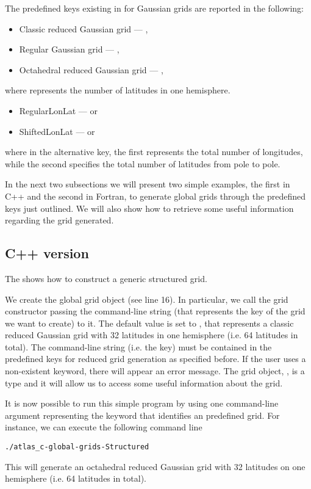 The predefined keys existing in \Atlas for Gaussian grids 
are reported in the following:
%
\begin{itemize}
\item Classic reduced Gaussian grid --- ,
\item Regular Gaussian grid --- ,
\item Octahedral reduced Gaussian grid --- ,
\end{itemize}
%
where \inltc{\#} represents the number of latitudes 
in one hemisphere.
%
\begin{itemize}
\item RegularLonLat ---  or 
\item ShiftedLonLat ---  or 
\end{itemize}
%
where in the alternative key, the first \inltc{\#} represents the total number 
of longitudes, while the second \inltc{\#} specifies the total number of 
latitudes from pole to pole.

In the next two subsections we will present two simple 
examples, the first in C++ and the second in Fortran, 
to generate global grids through the predefined keys 
just outlined. We will also show how to retrieve some 
useful information regarding the grid generated.

\subsection{C++ version}
The  shows how to construct a generic
structured grid.
%

%
We create the global 
grid object (see line 16). In particular, we call the 
grid constructor passing the command-line string (that 
represents the key of the grid we want to create) to it.
The default value is set to , that represents 
a classic reduced Gaussian grid with 32 latitudes in one hemisphere 
(i.e. 64 latitudes in total).  
The command-line string (i.e. the key) must be contained 
in the predefined keys for reduced grid generation as specified 
before. If the user uses a non-existent keyword, there will 
appear an error message.
The grid object, , is 
a  type and it will allow 
us to access some useful information about the grid.  

It is now possible to run this simple program by using one 
command-line argument representing the keyword that identifies 
an \Atlas predefined grid. For instance, we can execute the 
following command line
%
\begin{lstlisting}[style=BashStyle]
./atlas_c-global-grids-Structured
\end{lstlisting}
% 
This will generate an octahedral reduced Gaussian grid with 
32 latitudes on one hemisphere (i.e. 64 latitudes in total).

